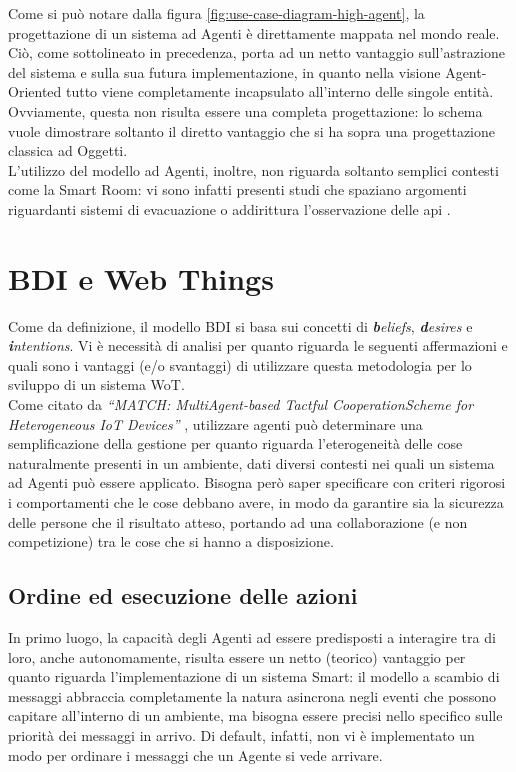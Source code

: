 \documentclass[12pt,a4paper,openright,oneside]{report}
\newcommand{\quotes}[1]{``#1''}
\begin{document}
Come si può notare dalla figura \ref{fig:use-case-diagram-high-agent}, la progettazione di un sistema ad Agenti è direttamente mappata nel mondo reale. Ciò, come sottolineato in precedenza, porta ad un netto vantaggio sull'astrazione del sistema e sulla sua futura implementazione, in quanto nella visione Agent-Oriented tutto viene completamente incapsulato all'interno delle singole entità. Ovviamente, questa non risulta essere una completa progettazione: lo schema vuole dimostrare soltanto il diretto vantaggio che si ha sopra una progettazione classica ad Oggetti.\\

L'utilizzo del modello ad Agenti, inoltre, non riguarda soltanto semplici contesti come la Smart Room: vi sono infatti presenti studi che spaziano argomenti riguardanti sistemi di evacuazione \cite{evacuation} o addirittura l'osservazione delle api \cite{bee}.

\section{BDI e Web Things}
Come da definizione, il modello BDI si basa sui concetti di \textit{\textbf{b}eliefs}, \textit{\textbf{d}esires} e \textit{\textbf{i}ntentions}. Vi è necessità di analisi per quanto riguarda le seguenti affermazioni e quali sono i vantaggi (e/o svantaggi) di utilizzare questa metodologia per lo sviluppo di un sistema WoT.\\

Come citato da \textit{\quotes{MATCH: MultiAgent-based Tactful CooperationScheme for Heterogeneous IoT Devices}} \cite{masiot}, utilizzare agenti può determinare una semplificazione della gestione per quanto riguarda l'eterogeneità delle cose naturalmente presenti in un ambiente, dati diversi contesti nei quali un sistema ad Agenti può essere applicato. Bisogna però saper specificare con criteri rigorosi i comportamenti che le cose debbano avere, in modo da garantire sia la sicurezza delle persone che il risultato atteso, portando ad una collaborazione (e non competizione) tra le cose che si hanno a disposizione.

\subsection{Ordine ed esecuzione delle azioni}
In primo luogo, la capacità degli Agenti ad essere predisposti a interagire tra di loro, anche autonomamente, risulta essere un netto (teorico) vantaggio per quanto riguarda l'implementazione di un sistema Smart: il modello a scambio di messaggi abbraccia completamente la natura asincrona negli eventi che possono capitare all'interno di un ambiente, ma bisogna essere precisi nello specifico sulle priorità dei messaggi in arrivo. Di default, infatti, non vi è implementato un modo per ordinare i messaggi che un Agente si vede arrivare.\\
\end{document}
